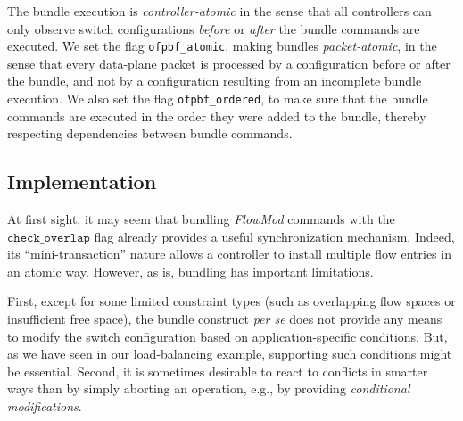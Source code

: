 \documentclass{sig-alternate-2006}
\newcommand{\checko}{\texttt{check\_overlap}\xspace}
\begin{document}



The bundle execution is \emph{controller-atomic}
in the sense that all controllers can only observe switch
configurations \emph{before} or \emph{after} the
bundle commands are executed.
We set the flag \texttt{ofpbf\_atomic},
making bundles \emph{packet-atomic},
in the sense that every data-plane packet is processed by a configuration
before or after the bundle, and not by a configuration resulting from
an incomplete bundle execution.
We also set the flag \texttt{ofpbf\_ordered},  to make sure that the
bundle commands are executed in the order they were added to the
bundle, thereby respecting dependencies between bundle commands.

\subsection{Implementation} 

At first sight, it may seem that bundling \emph{FlowMod} commands with  the $\checko$
flag already provides a useful synchronization mechanism.
Indeed, its ``mini-transaction'' nature allows a controller
to install multiple flow entries in an atomic way.
However, as is,
bundling has important limitations. %

First, %
except for some limited constraint types (such as
overlapping flow spaces or insufficient free space),
the bundle construct \emph{per se} 
does not provide any means to modify the switch configuration
based on application-specific conditions.
But, as we have seen in our load-balancing
example, supporting such conditions 
might be essential.
Second, it is sometimes desirable to react to conflicts in smarter ways than
by simply aborting an operation, e.g., by providing \emph{conditional modifications}.
\end{document}
